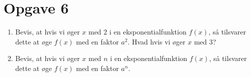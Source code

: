 \documentclass[12pt]{article}
\begin{document}
\section*{Opgave 6}
\begin{enumerate}[label=\roman*)]
\item Bevis, at hvis vi øger $x$ med 2 i en eksponentialfunktion $f(x)$, så tilsvarer dette at øge $f(x)$ med en faktor $a^2$. Hvad hvis vi øger $x$ med $3$?
\item Bevis, at hvis vi øger $x$ med $n$ i en eksponentialfunktion $f(x)$, så tilsvarer dette at øge $f(x)$ med en faktor $a^n$.
\end{enumerate}
\end{document}
